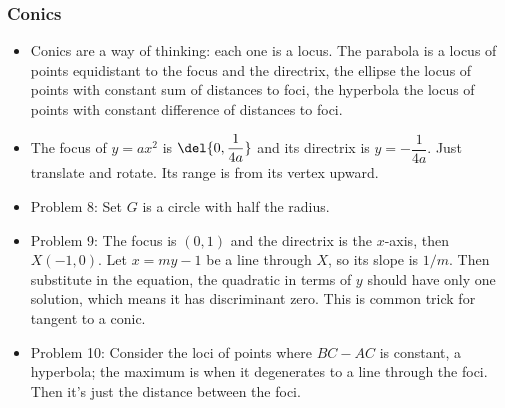 \documentclass[10pt,paper=letter]{scrartcl}
\begin{document}
\subsubsection*{Conics}

\begin{itemize}
  \item Conics are a way of thinking: each one is a locus. The parabola is a locus of points equidistant to the focus and the directrix, the ellipse the locus of points with constant sum of distances to foci, the hyperbola the locus of points with constant difference of distances to foci.
  \item The focus of $y = ax^2$ is $\del{0, \dfrac1{4a}}$ and its directrix is $y = -\dfrac1{4a}$. Just translate and rotate. Its range is from its vertex upward.
  \item Problem 8: Set $G$ is a circle with half the radius.
  \item Problem 9: The focus is $(0, 1)$ and the directrix is the $x$-axis, then $X(-1, 0)$. Let $x = my - 1$ be a line through $X$, so its slope is $1/m$. Then substitute in the equation, the quadratic in terms of $y$ should have only one solution, which means it has discriminant zero. This is common trick for tangent to a conic.
  \item Problem 10: Consider the loci of points where $BC - AC$ is constant, a hyperbola; the maximum is when it degenerates to a line through the foci. Then it's just the distance between the foci.
\end{itemize}
\end{document}
